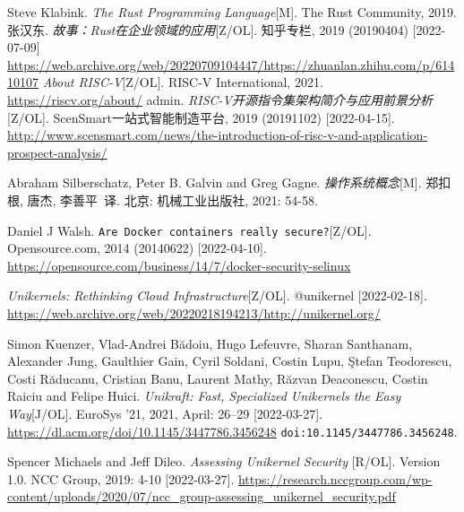 \documentclass{../runikraft-report}
\begin{document}
\begin{thebibliography}{99}
 Steve Klabink. \textit{The Rust Programming Language}[M]. The Rust Community, 2019.
 张汉东. \textit{故事：Rust在企业领域的应用}[Z/OL]. 知乎专栏, 2019 (20190404) [2022-07-09] \url{https://web.archive.org/web/20220709104447/https://zhuanlan.zhihu.com/p/61410107}
 \textit{About RISC-V}[Z/OL]. RISC-V International, 2021. \url{https://riscv.org/about/}
 admin. \textit{RISC-V开源指令集架构简介与应用前景分析}[Z/OL]. ScenSmart一站式智能制造平台, 2019 (20191102) [2022-04-15]. \url{http://www.scensmart.com/news/the-introduction-of-risc-v-and-application-prospect-analysis/}

 Abraham Silberschatz, Peter B. Galvin and Greg Gagne.
\textit{操作系统概念}[M]. 郑扣根, 唐杰, 李善平\ 译. 北京: 机械工业出版社, 2021: 54-58.

 Daniel J Walsh. \texttt{Are Docker containers really secure?}[Z/OL]. Opensource.com, 2014 (20140622) [2022-04-10]. \url{https://opensource.com/business/14/7/docker-security-selinux}

\textit{Unikernels: Rethinking Cloud Infrastructure}[Z/OL].
@unikernel [2022-02-18]. \url{https://web.archive.org/web/20220218194213/http://unikernel.org/}

 Simon Kuenzer, Vlad-Andrei Bădoiu, Hugo Lefeuvre, Sharan Santhanam,
Alexander Jung, Gaulthier Gain, Cyril Soldani, Costin Lupu, \c{S}tefan Teodorescu, Costi Răducanu,
Cristian Banu, Laurent Mathy, Răzvan Deaconescu, Costin Raiciu and Felipe Huici.
\textit{Unikraft: Fast, Specialized Unikernels the Easy Way}[J/OL]. EuroSys '21, 2021, April: 26–29
[2022-03-27]. \url{https://dl.acm.org/doi/10.1145/3447786.3456248} \texttt{doi:10.1145/3447786.3456248}.

 Spencer Michaels and Jeff Dileo. \textit{Assessing Unikernel Security
}[R/OL]. Version 1.0. NCC Group, 2019: 4-10 [2022-03-27].
\url{https://research.nccgroup.com/wp-content/uploads/2020/07/ncc_group-assessing_unikernel_security.pdf}


\end{thebibliography}
\end{document}
